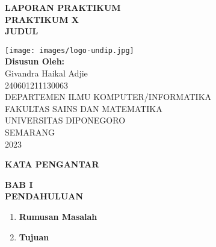\documentclass[12pt]{article}
\begin{document}
\begin{titlepage}
    \begin{center}
        {
            \textbf{\LARGE LAPORAN PRAKTIKUM} \\
            \textbf{\LARGE PRAKTIKUM X}\\
            \textbf{\LARGE JUDUL} \\
        }

        \vspace{1cm}
        \texttt{[image: images/logo-undip.jpg]} \\
        \vspace{1cm}
        \Large \textbf{ Disusun Oleh:} \\
        Givandra Haikal Adjie \\
        240601211130063 \\

        \vspace{1cm}
        DEPARTEMEN ILMU KOMPUTER/INFORMATIKA \\
        FAKULTAS SAINS DAN MATEMATIKA \\
        UNIVERSITAS DIPONEGORO \\
        SEMARANG \\
        2023 \\

    \end{center}
\end{titlepage}

\newpage

\begin{center}
    \textbf{\large KATA PENGANTAR} \\
\end{center}

\lipsum[1]

\newpage

\begin{center}
    {
        \textbf{\large BAB I} \\
        \textbf{\large PENDAHULUAN} \\
    }
\end{center}

\begin{enumerate}[label=\textbf{1.\arabic*}]
    \item \textbf{Rumusan Masalah}
    \item \textbf{Tujuan}
\end{enumerate}

\newpage
\end{document}
